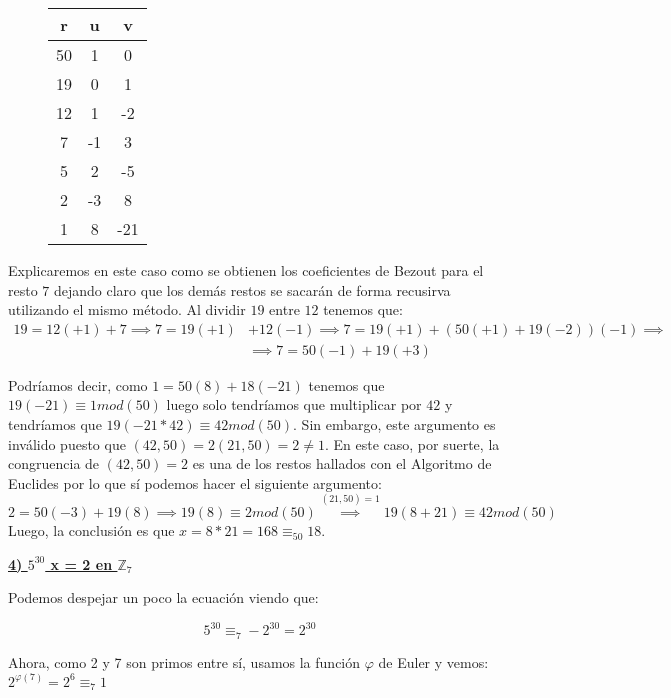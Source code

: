 \documentclass[11pt, a4paper, titlepage]{article}
\providecommand{\ent}{\mathbb{Z}}
\begin{document}
\begin{figure}[H]
\label{my-label}
\begin{center}
\begin{tabular}{|c|c|c|}
\hline
\textbf{r} & \textbf{u} & \textbf{v} \\ \hline
50         & 1          & 0          \\ \hline
19         & 0          & 1          \\ \hline
12         & 1         & -2          \\ \hline
7          & -1         & 3          \\ \hline
5          & 2          & -5         \\ \hline
2          & -3         & 8          \\ \hline
1          & 8          & -21        \\ \hline
\end{tabular}
\end{center}
\end{figure}
Explicaremos en este caso como se obtienen los coeficientes de Bezout para el resto $7$ dejando claro que los demás restos se sacarán de forma recusirva utilizando el mismo método. Al dividir $19$ entre $12$ tenemos que:
\begin{align*}
19=12(+1)+7 \implies 7=19(+1)&+12(-1) \implies 7=19(+1)+(50(+1)+19(-2))(-1)\implies \\
&\implies 7=50(-1)+19(+3)
\end{align*}

Podríamos decir, como $1=50(8)+18(-21)$ tenemos que $19(-21)\equiv1 mod(50)$ luego solo tendríamos que multiplicar por $42$ y tendríamos que $19(-21*42)\equiv42 mod(50)$. Sin embargo, este argumento es inválido puesto que $(42,50)=2(21,50)=2\ne1$. 
En este caso, por suerte, la congruencia de $(42,50)=2$ es una de los restos hallados con el Algoritmo de Euclides por lo que sí podemos hacer el siguiente argumento:
\[
2=50(-3)+19(8) \implies 19(8)\equiv 2 mod(50) \stackrel{(21,50)=1}{\implies} 19(8+21)\equiv 42 mod(50)
\]
Luego, la conclusión es que $x=8*21=168\equiv_{50} 18$.

\underline{\textbf{4) $5^{30}$ x = 2 en $\ent_7$ }}

Podemos despejar un poco la ecuación viendo que:

\[
5^{30} \equiv_7 -2^{30} = 2^{30}
\]

Ahora, como 2 y 7 son primos entre sí, usamos la función $\varphi $ de Euler y vemos: $2^{\varphi(7)} = 2^6 \equiv_7 1$
\end{document}
